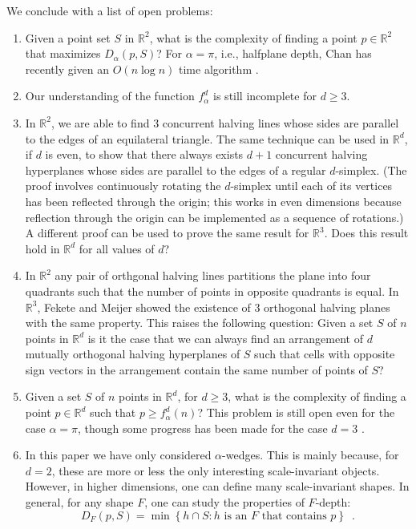 \documentclass[lotsofwhite]{patmorin}
\begin{document}
We conclude with a list of open problems:

\begin{enumerate}
\item Given a point set $S$ in $\mathbb{R}^2$, what is the complexity
of finding a point $p\in\mathbb{R}^2$ that maximizes $D_\alpha(p,S)$?
For $\alpha=\pi$, i.e., halfplane depth, Chan has recently given an
$O(n\log n)$ time algorithm \cite{c04}.

\item Our understanding of the function $f^d_\alpha$ is still
incomplete for $d\ge 3$.

\item In $\mathbb{R}^2$, we are able to find 3 concurrent halving
lines whose sides are parallel to the edges of an equilateral
triangle.  The same technique can be used in $\mathbb{R}^d$, if $d$ is
even, to show that there always exists $d+1$ concurrent halving
hyperplanes whose sides are parallel to the edges of a regular
$d$-simplex. (The proof involves continuously rotating the
$d$-simplex until each of its vertices has been reflected through the
origin; this works in even dimensions because reflection through the
origin can be implemented as a sequence of rotations.)
A different proof can be used to prove the same result for
$\mathbb{R}^3$.  Does this result hold in $\mathbb{R}^d$ for all
values of $d$?

\item In $\mathbb{R}^2$ any pair of orthgonal halving lines partitions
the plane into four quadrants such that the number of points in
opposite quadrants is equal. In $\mathbb{R}^3$, Fekete and Meijer
\cite{fm00} showed the existence of 3 orthogonal halving planes with the same
property.  This raises the following question: Given a set $S$ of $n$
points in $\mathbb{R}^d$ is it the case that we can always find an
arrangement of $d$ mutually orthogonal halving hyperplanes of $S$ such
that cells with opposite sign vectors in the arrangement contain the
same number of points of $S$?

\item Given a set $S$ of $n$ points in $\mathbb{R}^d$, for $d\ge 3$,
what is the complexity of finding a point $p\in \mathbb{R}^d$ such
that $p\ge f_\alpha^d(n)$?  This problem is still open even for the
case $\alpha=\pi$, though some progress has been made for the case
$d=3$ \cite{X,X,X}.

\item In this paper we have only considered $\alpha$-wedges.  This is
mainly because, for $d=2$, these are more or less the only interesting
scale-invariant objects.  However, in higher dimensions, one can
define many scale-invariant shapes.  In general, for any shape $F$,
one can study the properties of $F$-depth:
\[
  D_F(p,S) = \min\left\{ 
     h\cap S : \mbox{$h$ is an $F$ that contains $p$}
  \right\} \enspace .
\] 
\end{enumerate}
\end{document}
